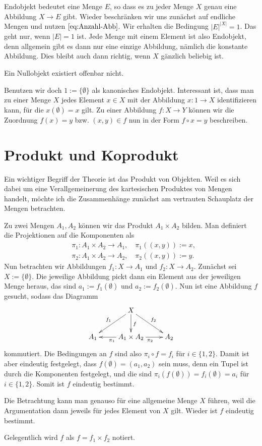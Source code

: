 Endobjekt bedeutet eine Menge $E$, so dass es zu jeder Menge $X$
genau eine Abbildung $X\to E$ gibt. Wieder beschränken wir uns
zunächst auf endliche Mengen und nutzen $\eqref{eq:Anzahl-Abb}$.
Wir erhalten die Bedingung $|E|^{|X|}=1$. Das geht nur, wenn
$|E|=1$ ist. Jede Menge mit einem Element ist also Endobjekt,
denn allgemein gibt es dann nur eine einzige Abbildung, nämlich
die konstante Abbildung. Dies bleibt auch dann richtig, wenn
$X$ gänzlich beliebig ist.

Ein Nullobjekt existiert offenbar nicht.

Benutzen wir doch $1:=\{\emptyset\}$ als kanonisches Endobjekt.
Interessant ist, dass man zu einer Menge $X$ jedes Element
$x\in X$ mit der Abbildung $x\colon 1\to X$ identifizieren kann,
für die $x(\emptyset)=x$ gilt. Zu einer Abbildung $f\colon X\to Y$
können wir die Zuordnung $f(x)=y$ bzw. $(x,y)\in f$ nun in der Form
$f\circ x = y$ beschreiben.

\section{Produkt und Koprodukt}

Ein wichtiger Begriff der Theorie ist das Produkt von
Objekten. Weil es sich dabei um eine Verallgemeinerung des
kartesischen Produktes von Mengen handelt, möchte ich die
Zusammenhänge zunächst am vertrauten Schauplatz der Mengen
betrachten.

Zu zwei Mengen $A_1, A_2$ können wir das Produkt
$A_1\times A_2$ bilden. Man definiert die Projektionen
auf die Komponenten als
\begin{align*}
&\pi_1\colon A_1\times A_2\to A_1,\quad\pi_1((x,y)) := x,\\
&\pi_2\colon A_1\times A_2\to A_2,\quad\pi_2((x,y)) := y.
\end{align*}
Nun betrachten wir Abbildungen $f_1\colon X\to A_1$ und
$f_2\colon X\to A_2$. Zunächst sei $X:=\{\emptyset\}$. Die jeweilige
Abbildung pickt dann ein Element aus der jeweiligen Menge heraus,
das sind $a_1:=f_1(\emptyset)$ und $a_2:=f_2(\emptyset)$. Nun
ist eine Abbildung $f$ gesucht, sodass das Diagramm
\[\xymatrix{
& X\ar[dl]_{f_1}\ar[dr]^{f_2}\ar[d]^f & \\
A_1 & A_1\times A_2 \ar[l]^{\pi_1}\ar[r]_{\pi_2} & A_2
}\]
kommutiert. Die Bedingungen an $f$ sind also
$\pi_i\circ f = f_i$ für $i\in\{1,2\}$. Damit ist aber eindeutig
festgelegt, dass $f(\emptyset)=(a_1,a_2)$ sein muss, denn ein
Tupel ist durch die Komponenten festgelegt, und die sind
$\pi_i(f(\emptyset)) = f_i(\emptyset) = a_i$ für $i\in\{1,2\}$.
Somit ist $f$ eindeutig bestimmt.

Die Betrachtung kann man genauso für eine allgemeine Menge $X$ führen,
weil die Argumentation dann jeweils für jedes Element von $X$ gilt.
Wieder ist $f$ eindeutig bestimmt.

Gelegentlich wird $f$ als $f=f_1\times f_2$ notiert.

